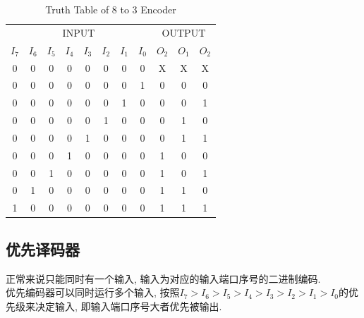 \documentclass[scheme=chinese,a4paper]{report}
\begin{document}
\begin{table}[H]
    \centering
    \caption{Truth Table of 8 to 3 Encoder}
      \begin{tabular}{cccccccc|ccc}
      \multicolumn{8}{c}{INPUT}                                     & \multicolumn{3}{c}{OUTPUT} \\
      $I_7$  & $I_6$  & $I_5$  & $I_4$  & $I_3$  & $I_2$  & $I_1$  & $I_0$  & $O_2$  & $O_1$  & $O_2$ \\
      0     & 0     & 0     & 0     & 0     & 0     & 0     & 0     & X     & X     & X \\
      0     & 0     & 0     & 0     & 0     & 0     & 0     & 1     & 0     & 0     & 0 \\
      0     & 0     & 0     & 0     & 0     & 0     & 1     & 0     & 0     & 0     & 1 \\
      0     & 0     & 0     & 0     & 0     & 1     & 0     & 0     & 0     & 1     & 0 \\
      0     & 0     & 0     & 0     & 1     & 0     & 0     & 0     & 0     & 1     & 1 \\
      0     & 0     & 0     & 1     & 0     & 0     & 0     & 0     & 1     & 0     & 0 \\
      0     & 0     & 1     & 0     & 0     & 0     & 0     & 0     & 1     & 0     & 1 \\
      0     & 1     & 0     & 0     & 0     & 0     & 0     & 0     & 1     & 1     & 0 \\
      1     & 0     & 0     & 0     & 0     & 0     & 0     & 0     & 1     & 1     & 1 \\
      \end{tabular}%
  \end{table}%
  \subsection{优先译码器}
  正常来说只能同时有一个输入, 输入为对应的输入端口序号的二进制编码. \\
  优先编码器可以同时运行多个输入, 按照$I_7>I_6>I_5>I_4>I_3>I_2>I_1>I_0$的优先级来决定输入, 即输入端口序号大者优先被输出. 
\end{document}
